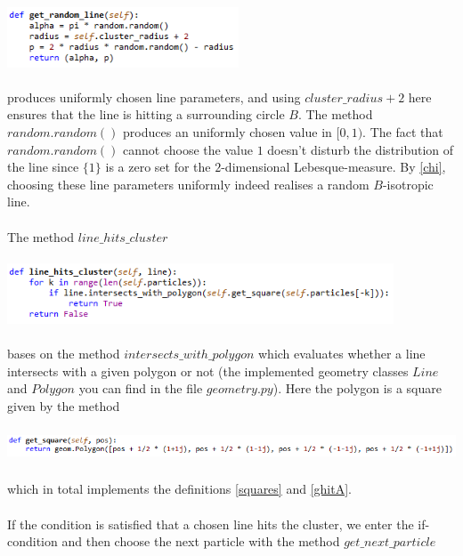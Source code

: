 \documentclass[12pt,a4paper]{scrartcl}
\numberwithin{equation}{subsection}
\newcommand{\1}{\mathbbm{1}}
\numberwithin{equation}{section}
\theoremstyle{definition}
\begin{document}
\\
\includegraphics[height=1.8cm]{images/code-snippets/randomline.png} \\
\\
produces uniformly chosen line parameters, and using $\mathit{cluster\_radius + 2}$ here ensures that the line is hitting a surrounding circle $B$. The method $\mathit{random.random()}$ produces an uniformly chosen value in $[0,1)$. The fact that $\mathit{random.random()}$ cannot choose the value $1$ doesn't disturb the distribution of the line since $\{1\}$ is a zero set for the $2$-dimensional Lebesque-measure. By \ref{chi}, choosing these line parameters uniformly indeed realises a random $B$-isotropic line. \\
\\The method $\mathit{line\_hits\_cluster}$ \\
\\
\includegraphics[height=1.8cm]{images/code-snippets/linehitscluster.png} \\
\\
bases on the method $\mathit{intersects\_with\_polygon}$ which evaluates whether a line intersects with a given polygon or not (the implemented geometry classes $\mathit{Line}$ and $\mathit{Polygon}$ you can find in the file $\mathit{geometry.py}$). Here the polygon is a square given by the method \\
\\
\includegraphics[height=0.8cm]{images/code-snippets/getsquare.png} \\
\\
which in total implements the definitions \ref{squares} and \ref{ghitA}. \\
\\If the condition is satisfied that a chosen line hits the cluster, we enter the if-condition and then choose the next particle with the method $\mathit{get\_next\_particle}$\\
\end{document}
